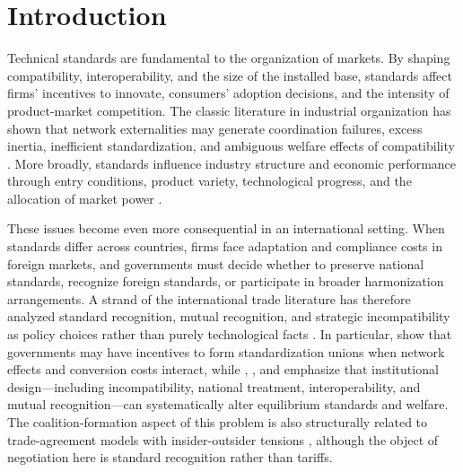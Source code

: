\section{Introduction}

Technical standards are fundamental to the organization of markets. By shaping compatibility, interoperability, and the size of the installed base, standards affect firms' incentives to innovate, consumers' adoption decisions, and the intensity of product-market competition. The classic literature in industrial organization has shown that network externalities may generate coordination failures, excess inertia, inefficient standardization, and ambiguous welfare effects of compatibility \citep{FarrellSaloner1985,KatzShapiro1985,KatzShapiro1986,FarrellSaloner1986,KatzShapiro1992,KatzShapiro1994}. More broadly, standards influence industry structure and economic performance through entry conditions, product variety, technological progress, and the allocation of market power \citep{DavidGreenstein1990,MatutesRegibeau1996,Shy2001,BesenFarrell1994,Tassey2017}.

These issues become even more consequential in an international setting. When standards differ across countries, firms face adaptation and compliance costs in foreign markets, and governments must decide whether to preserve national standards, recognize foreign standards, or participate in broader harmonization arrangements. A strand of the international trade literature has therefore analyzed standard recognition, mutual recognition, and strategic incompatibility as policy choices rather than purely technological facts \citep{GandalShy2001,BarrettYang2001,Costinot2008,Klimenko2009}. In particular, \citet{GandalShy2001} show that governments may have incentives to form standardization unions when network effects and conversion costs interact, while \citet{BarrettYang2001}, \citet{Costinot2008}, and \citet{Klimenko2009} emphasize that institutional design---including incompatibility, national treatment, interoperability, and mutual recognition---can systematically alter equilibrium standards and welfare. The coalition-formation aspect of this problem is also structurally related to trade-agreement models with insider-outsider tensions \citep{Riezman1985,Krishna1998}, although the object of negotiation here is standard recognition rather than tariffs.

